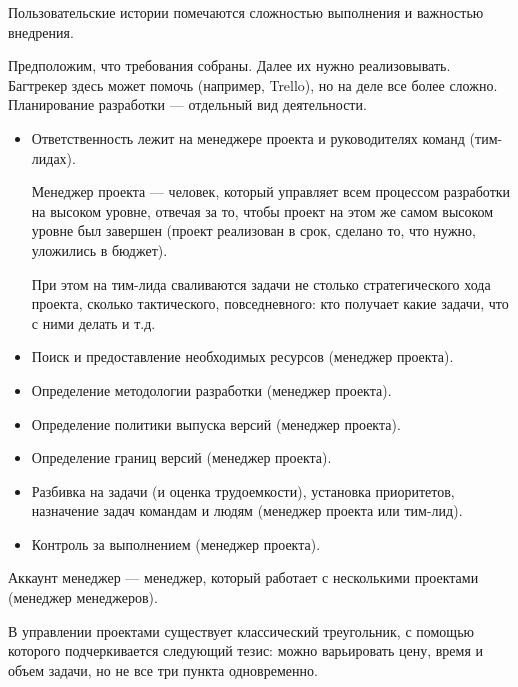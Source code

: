     \begin{Rem}
        Пользовательские истории помечаются сложностью выполнения и важностью внедрения.
    \end{Rem}


    \begin{Rem}
        Предположим, что требования собраны. Далее их нужно реализовывать. Багтрекер здесь может помочь (например, Trello), но на деле все более сложно. Планирование разработки --- отдельный вид деятельности. 

        \begin{itemize}
            \item Ответственность лежит на менеджере проекта и руководителях команд (тим-лидах). 
            
            Менеджер проекта --- человек, который управляет всем процессом разработки на высоком уровне, отвечая за то, чтобы проект на этом же самом высоком уровне был завершен (проект реализован в срок, сделано то, что нужно, уложились в бюджет). 

            При этом на тим-лида сваливаются задачи не столько стратегического хода проекта, сколько тактического, повседневного: кто получает какие задачи, что с ними делать и т.д.
            \item Поиск и предоставление необходимых ресурсов (менеджер проекта).
            \item Определение методологии разработки (менеджер проекта). 
            \item Определение политики выпуска версий (менеджер проекта).
            \item Определение границ версий (менеджер проекта).
            \item Разбивка на задачи (и оценка трудоемкости), установка приоритетов, назначение задач командам и людям (менеджер проекта или тим-лид).
            \item Контроль за выполнением (менеджер проекта).
        \end{itemize}
    \end{Rem}

    \begin{Rem}
        Аккаунт менеджер --- менеджер, который работает с несколькими проектами (менеджер менеджеров).
    \end{Rem}

    \begin{Def}
        В управлении проектами существует классический треугольник, с помощью которого подчеркивается следующий тезис: можно варьировать цену, время и объем задачи, но не все три пункта одновременно.
    \end{Def}

